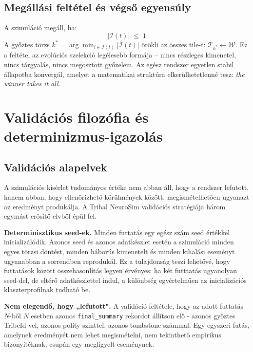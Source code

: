 ﻿\documentclass[a4paper,12pt]{report}
\begin{document}
\subsection*{Megállási feltétel és végső egyensúly}

A szimuláció megáll, ha:
\begin{equation}
|\mathcal{I}(t)| \;\leq\; 1
\end{equation}
A győztes törzs $k^* = \arg\min_{i \in \mathcal{I}(t)} |\mathcal{I}(t)|$ örökli az összes
tile-t: $\mathcal{T}_{k^*} \leftarrow \mathcal{W}$. Ez a feltétel az evolúciós szelekció
legélesebb formája -- nincs részleges kimenetel, nincs tárgyalás, nincs megosztott győzelem.
Az egész rendszer egyetlen stabil állapotba konvergál, amelyet a matematikai struktúra
elkerülhetetlenné tesz: \textit{the winner takes it all}.

\section{Validációs filozófia és determinizmus-igazolás}
\label{sec:neurosim-26-validation}

\subsection*{Validációs alapelvek}

A szimulációs kísérlet tudományos értéke nem abban áll, hogy a rendszer lefutott, hanem abban, hogy ellenőrizhető körülmények között, megismételhetően ugyanazt az eredményt produkálja. A Tribal NeuroSim validációs stratégiája három egymást erősítő elvből épül fel.

\textbf{Determinisztikus seed-ek.} Minden futtatás egy egész szám seed értékkel inicializálódik. Azonos seed és azonos adatkészlet esetén a szimuláció minden egyes törzsi döntést, minden háborús kimenetelt és minden kihalási eseményt ugyanabban a sorrendben reprodukál. Ez a tulajdonság teszi lehetővé, hogy futtatások között összehasonlítás legyen érvényes: ha két futttatás ugyanolyan seed-del, de eltérő adatkészlettel indul, a különbség egyértelműen az inicializációs klaszterprofilnak tudható be.

\textbf{Nem elegendő, hogy „lefutott".} A validáció feltétele, hogy az adott futtatás $N$-ből $N$ esetben azonos \texttt{final\_summary} rekordot állítson elő - azonos győztes TribeId-vel, azonos polity-szinttel, azonos tombstone-számmal. Egy egyszeri futás, amelynek eredményét nem lehet megismételni, nem tekinthető empirikus bizonyítéknak; csupán egy megfigyelt eseménynek.
\end{document}
